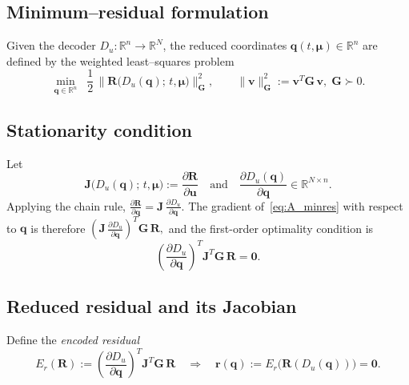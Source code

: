 \subsection{Minimum–residual formulation}
Given the decoder \(D_u : \mathbb{R}^{n}\to\mathbb{R}^{N}\), the
reduced coordinates \(\mathbf{q}(t,\boldsymbol{\mu})\in\mathbb{R}^{n}\) are
defined by the weighted least–squares problem
%
\begin{equation}
\min_{\mathbf q\in\mathbb{R}^{n}}
\;\;
\frac12\,
\bigl\|
  \mathbf R\bigl(D_u(\mathbf q);\,t,\boldsymbol\mu\bigr)
\bigr\|_{\mathbf G}^{2},
\qquad
\|\mathbf v\|_{\mathbf G}^{2}:=\mathbf v^{T}\mathbf G\,\mathbf v,\;
\mathbf G\succ0.
\label{eq:A_minres}
\end{equation}

\subsection{Stationarity condition}
Let
\[
\mathbf J
\bigl(D_u(\mathbf q);\,t,\boldsymbol\mu\bigr)
:=
\frac{\partial\mathbf R}{\partial\mathbf u}
\quad\text{and}\quad
\frac{\partial D_u(\mathbf q)}{\partial\mathbf q}
\in\mathbb{R}^{N\times n}.
\]
Applying the chain rule,
\(
\tfrac{\partial\mathbf R}{\partial\mathbf q}
      =\mathbf J\,\tfrac{\partial D_u}{\partial\mathbf q}.
\)
The gradient of~\eqref{eq:A_minres} with respect to \(\mathbf q\) is therefore
\(
(\mathbf J\,\tfrac{\partial D_u}{\partial\mathbf q})^{T}
\mathbf G\,
\mathbf R,
\)
and the first-order optimality condition is
%
\begin{equation}
\left(
 \frac{\partial D_u}{\partial\mathbf q}
\right)^{T}
\mathbf J^{T}
\mathbf G\,
\mathbf R = \mathbf 0.
\label{eq:A_stationarity}
\end{equation}

\subsection{Reduced residual and its Jacobian}
Define the \emph{encoded residual}
\begin{equation}
E_r(\mathbf R):=
\left(
 \frac{\partial D_u}{\partial\mathbf q}
\right)^{T}
\mathbf J^{T}
\mathbf G\,\mathbf R
\quad\Longrightarrow\quad
\mathbf r(\mathbf q):=
E_r\bigl(\mathbf R(D_u(\mathbf q))\bigr)=\mathbf 0.
\label{eq:A_encodedResidual}
\end{equation}

